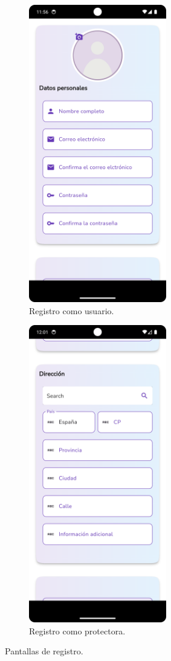 \documentclass[a4paper, 12pt]{article}
\begin{document}
\begin{figure}[H]
   	\begin{subfigure}{0.48\textwidth}
		\begin{center}
			{\includegraphics[width=6cm]{app/RegisterUserEmpty.png}\par}
			\caption{Registro como usuario.}
		\end{center}  
	\end{subfigure}\hfill
   	\begin{subfigure}{0.48\textwidth}
		\begin{center}
			{\includegraphics[width=6cm]{app/RegisterCompanyAddress.png}\par}
			\caption{Registro como protectora.}
		\end{center}  
	\end{subfigure}\hfill
	\caption{Pantallas de registro.}
\end{figure}
\end{document}
